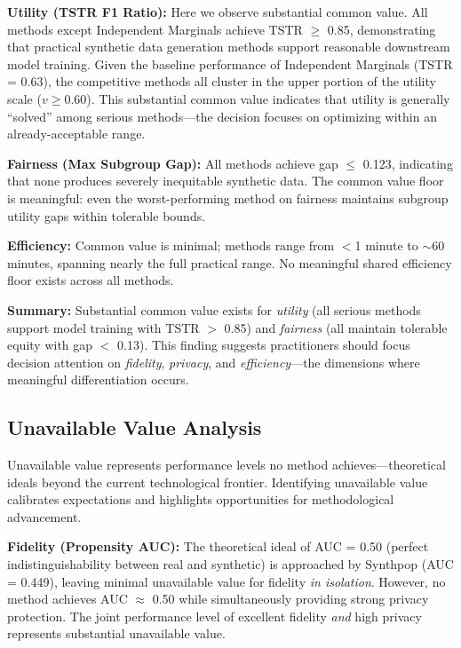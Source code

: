 \documentclass[12pt,a4paper]{article}
\begin{document}
\textbf{Utility (TSTR F1 Ratio):} Here we observe substantial common value. All methods except Independent Marginals achieve TSTR $\geq$ 0.85, demonstrating that practical synthetic data generation methods support reasonable downstream model training. Given the baseline performance of Independent Marginals (TSTR = 0.63), the competitive methods all cluster in the upper portion of the utility scale ($v \geq 0.60$). This substantial common value indicates that utility is generally ``solved'' among serious methods---the decision focuses on optimizing within an already-acceptable range.

\textbf{Fairness (Max Subgroup Gap):} All methods achieve gap $\leq$ 0.123, indicating that none produces severely inequitable synthetic data. The common value floor is meaningful: even the worst-performing method on fairness maintains subgroup utility gaps within tolerable bounds.

\textbf{Efficiency:} Common value is minimal; methods range from $<$1 minute to $\sim$60 minutes, spanning nearly the full practical range. No meaningful shared efficiency floor exists across all methods.

\textbf{Summary:} Substantial common value exists for \textit{utility} (all serious methods support model training with TSTR $>$ 0.85) and \textit{fairness} (all maintain tolerable equity with gap $<$ 0.13). This finding suggests practitioners should focus decision attention on \textit{fidelity}, \textit{privacy}, and \textit{efficiency}---the dimensions where meaningful differentiation occurs.

\subsection{Unavailable Value Analysis}

Unavailable value represents performance levels no method achieves---theoretical ideals beyond the current technological frontier. Identifying unavailable value calibrates expectations and highlights opportunities for methodological advancement.

\textbf{Fidelity (Propensity AUC):} The theoretical ideal of AUC = 0.50 (perfect indistinguishability between real and synthetic) is approached by Synthpop (AUC = 0.449), leaving minimal unavailable value for fidelity \textit{in isolation}. However, no method achieves AUC $\approx$ 0.50 while simultaneously providing strong privacy protection. The joint performance level of excellent fidelity \textit{and} high privacy represents substantial unavailable value.
\end{document}
